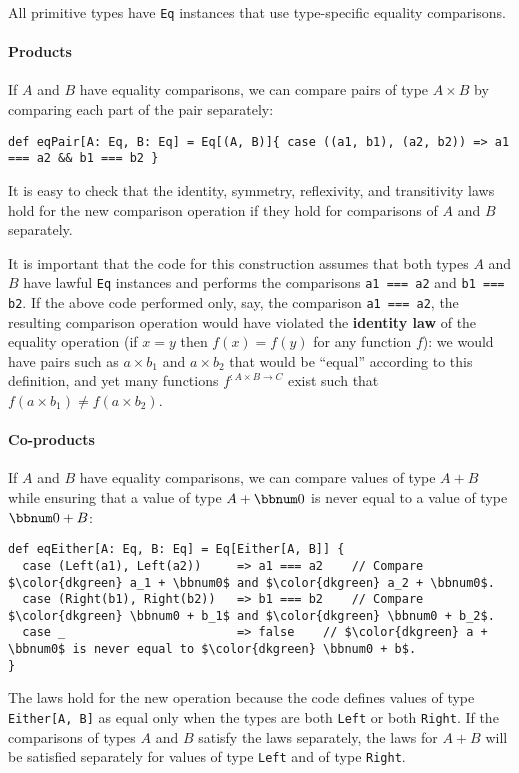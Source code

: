All primitive types have \lstinline!Eq! instances that use type-specific
equality comparisons.

\paragraph{Products}

If $A$ and $B$ have equality comparisons, we can compare pairs of
type $A\times B$ by comparing each part of the pair separately:
\begin{lstlisting}
def eqPair[A: Eq, B: Eq] = Eq[(A, B)]{ case ((a1, b1), (a2, b2)) => a1 === a2 && b1 === b2 }
\end{lstlisting}
It is easy to check that the identity, symmetry, reflexivity, and
transitivity laws hold for the new comparison operation if they hold
for comparisons of $A$ and $B$ separately.

It is important that the code for this construction assumes that both
types $A$ and $B$ have lawful \lstinline!Eq! instances and performs
the comparisons \lstinline!a1 === a2! and \lstinline!b1 === b2!.
If the above code performed only, say, the comparison \lstinline!a1 === a2!,
the resulting comparison operation would have violated the \textbf{identity
law} of the equality operation (if $x=y$ then $f(x)=f(y)$ for any
function $f$): we would have pairs such as $a\times b_{1}$ and $a\times b_{2}$
that would be \textsf{``}equal\textsf{''} according to this definition, and yet many
functions $f^{:A\times B\rightarrow C}$ exist such that $f(a\times b_{1})\neq f(a\times b_{2})$.

\paragraph{Co-products}

If $A$ and $B$ have equality comparisons, we can compare values
of type $A+B$ while ensuring that a value of type $A+\bbnum 0$ is
never equal to a value of type $\bbnum 0+B$:
\begin{lstlisting}[mathescape=true]
def eqEither[A: Eq, B: Eq] = Eq[Either[A, B]] {
  case (Left(a1), Left(a2))     => a1 === a2    // Compare $\color{dkgreen} a_1 + \bbnum0$ and $\color{dkgreen} a_2 + \bbnum0$.
  case (Right(b1), Right(b2))   => b1 === b2    // Compare $\color{dkgreen} \bbnum0 + b_1$ and $\color{dkgreen} \bbnum0 + b_2$.
  case _                        => false    // $\color{dkgreen} a + \bbnum0$ is never equal to $\color{dkgreen} \bbnum0 + b$.
}
\end{lstlisting}
The laws hold for the new operation because the code defines values
of type \lstinline!Either[A, B]! as equal only when the types are
both \lstinline!Left! or both \lstinline!Right!. If the comparisons
of types $A$ and $B$ satisfy the laws separately, the laws for $A+B$
will be satisfied separately for values of type \lstinline!Left!
and of type \lstinline!Right!.

